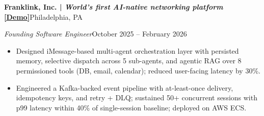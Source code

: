 \documentclass[10pt,letterpaper]{article}
\newcommand{\resheading}[4]{%
    \textbf{#1}\hfill #2\par
    \textit{#3}\hfill #4\par
}
\begin{document}
\vspace{3pt}
\resheading{Franklink, Inc. \;|\; \normalfont\textit{World's first AI-native networking platform} \textbf{\href{https://artysicistz.github.io/projects/franklink-demo.html}{[Demo]}}}{Philadelphia, PA}{Founding Software Engineer}{October 2025 -- February 2026}
\begin{itemize}
    \item Designed iMessage-based multi-agent orchestration layer with persisted memory, selective dispatch across 5 sub-agents, and agentic RAG over 8 permissioned tools (DB, email, calendar); reduced user-facing latency by 30\%.
    \item Engineered a Kafka-backed event pipeline with at-least-once delivery, idempotency keys, and retry + DLQ; sustained 50+ concurrent sessions with p99 latency within 40\% of single-session baseline; deployed on AWS ECS.
\end{itemize}
\end{document}
